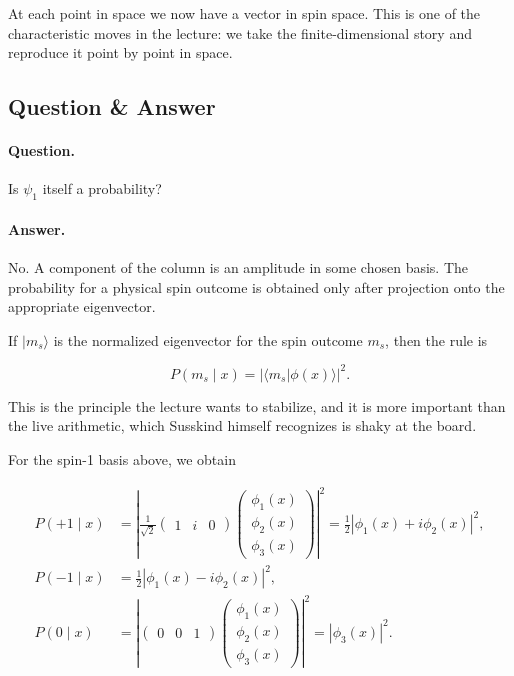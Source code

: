 At each point in space we now have a vector in spin space. This is one of the characteristic moves in the lecture: we take the finite-dimensional story and reproduce it point by point in space.

\subsection{Question \& Answer}

\paragraph{Question.} Is \(\psi_1\) itself a probability?

\paragraph{Answer.} No. A component of the column is an amplitude in some chosen basis. The probability for a physical spin outcome is obtained only after projection onto the appropriate eigenvector.

If \(|m_s\rangle\) is the normalized eigenvector for the spin outcome \(m_s\), then the rule is

\begin{equation}
P(m_s\mid x)=|\langle m_s|\phi(x)\rangle|^2.
\end{equation}

This is the principle the lecture wants to stabilize, and it is more important than the live arithmetic, which Susskind himself recognizes is shaky at the board.

For the spin-1 basis above, we obtain

\begin{align}
P(+1\mid x)
&=
\left|
\frac{1}{\sqrt2}
\begin{pmatrix}
1&i&0
\end{pmatrix}
\begin{pmatrix}
\phi_1(x)\\
\phi_2(x)\\
\phi_3(x)
\end{pmatrix}
\right|^2
=
\frac12\left|\phi_1(x)+i\phi_2(x)\right|^2,\\
P(-1\mid x)
&=
\frac12\left|\phi_1(x)-i\phi_2(x)\right|^2,\\
P(0\mid x)
&=
\left|
\begin{pmatrix}
0&0&1
\end{pmatrix}
\begin{pmatrix}
\phi_1(x)\\
\phi_2(x)\\
\phi_3(x)
\end{pmatrix}
\right|^2
=
|\phi_3(x)|^2.
\end{align}


